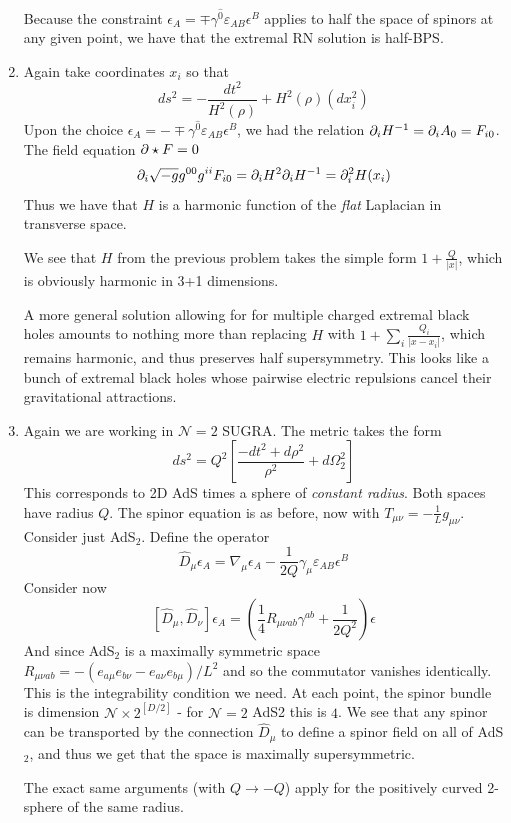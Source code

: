 \documentclass[11pt, class=article, crop=false]{standalone}
\begin{document}
\begin{enumerate}
	Because the constraint $\epsilon_A = \mp \gamma^{\hat 0} \varepsilon_{AB} \epsilon^B$ applies to half the space of spinors at any given point, we have that the extremal RN solution is half-BPS. 
	
	\item 
	Again take coordinates $x_i$ so that
	\[
		ds^2 = -\frac{dt^2}{H^2(\rho)} + H^2(\rho) (dx_i^2)
	\]
	 Upon the choice $\epsilon_A = -\mp \gamma^{\hat 0} \varepsilon_{AB}  \epsilon^B$, we had the relation $\partial_i H^{-1} = \partial_i A_0 = F_{i0}$. The field equation $\partial \star F = 0$
	 \[
	 	\partial_i \sqrt{-g} g^{00} g^{ii} F_{i0} = \partial_i H^2 \partial_i H^{-1} = \partial_i^2 H(x_i)
	 \]
	 Thus we have that $H$ is a harmonic function of the \emph{flat} Laplacian in transverse space. 
	
	We see that $H$ from the previous problem takes the simple form $1+ \frac{Q}{|x|}$, which is obviously harmonic in 3+1 dimensions.
	
	A more general solution allowing for for multiple charged extremal black holes amounts to nothing more than replacing $H$ with $1 + \sum_i \frac{Q_i}{|x - x_i|}$, which remains harmonic, and thus preserves half supersymmetry. This looks like a bunch of extremal black holes whose pairwise electric repulsions cancel their gravitational attractions.
	
	\item Again we are working in $\mathcal N = 2$ SUGRA. The metric takes the form
	\[
		ds^2 = Q^2 \left[ \frac{-dt^2 + d\rho^2}{\rho^2} + d \Omega_2^2 \right]
	\]
	This corresponds to 2D AdS times a sphere of \emph{constant radius}. Both spaces have radius $Q$. The spinor equation is as before, now with $T_{\mu \nu} = -\frac{1}{L} g_{\mu \nu}$. Consider just AdS$_{2}$. Define the operator 
	\[
		\hat D_{\mu} \epsilon_A = \nabla_\mu \epsilon_A - \frac{1}{2 Q} \gamma_{\mu} \varepsilon_{AB} \epsilon^B
	\]
	Consider now
	\[
		[\hat D_{\mu}, \hat D_\nu] \epsilon_A = (\frac14 R_{\mu \nu a b} \gamma^{a b} + \frac1{2Q^2}) \epsilon
	\]
	And since AdS$_{2}$ is a maximally symmetric space $R_{\mu \nu a b} = - (e_{a\mu} e_{b\nu} - e_{a \nu} e_{b \mu})/L^2$ and so the commutator vanishes identically. This is the integrability condition we need. At each point, the spinor bundle is dimension $\mathcal N \times 2^{[D/2]}$ - for $\mathcal N=2$ AdS2 this is $4$. We see that any spinor can be transported by the connection $\hat D_{\mu}$ to define a spinor field on all of AdS$_{2}$, and thus we get that the space is maximally supersymmetric.
	
	The exact same arguments (with $Q \to -Q$) apply for the positively curved 2-sphere of the same radius. 
	

\end{enumerate}
\end{document}
